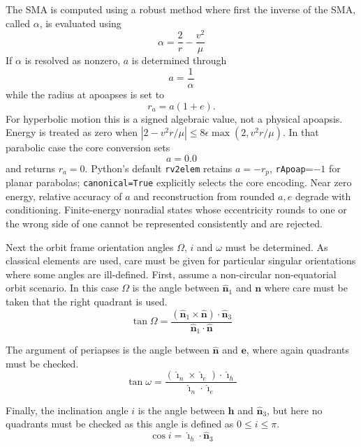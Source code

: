 The SMA is computed using a robust method where first the inverse of the SMA, called $\alpha$, is evaluated using\cite{schaub}
\begin{equation}
	\alpha = \frac{2}{r} - \frac{v^{2}}{\mu}
\end{equation}
If $\alpha$ is resolved as nonzero, $a$ is determined through
\begin{equation}
	a = \frac{1}{\alpha}
\end{equation}
while the radius at apoapses is set to
\begin{equation}
	r_{a} = a(1+e).
\end{equation}
For hyperbolic motion this is a signed algebraic value, not a physical apoapsis. Energy is treated as zero when $|2-v^2r/\mu|\leq8\epsilon\max(2,v^2r/\mu)$. In that parabolic case the core conversion sets
$$
	a = 0.0
$$
and returns $r_a=0$. Python's default {\tt rv2elem} retains $a=-r_p$, {\tt rApoap}=$-1$ for planar parabolas; {\tt canonical=True} explicitly selects the core encoding. Near zero energy, relative accuracy of $a$ and reconstruction from rounded $a,e$ degrade with conditioning. Finite-energy nonradial states whose eccentricity rounds to one or the wrong side of one cannot be represented consistently and are rejected.


Next the orbit frame orientation angles $\Omega$, $i$ and $\omega$ must be determined.  As classical elements are used, care must be given for particular singular orientations where some angles are ill-defined.  First, assume a non-circular non-equatorial orbit scenario.  In this case $\Omega$ is the angle between $\hat{\bm n}_{1}$ and $\bm n$ where care must be taken that the right quadrant is used.
\begin{equation}
	\tan \Omega = \frac{(\hat{\bm n}_{1} \times \hat{\bm n}) \cdot \hat{\bm n}_{3}}
	{\hat{\bm n}_{1} \cdot \hat{\bm n}}
\end{equation}


The argument of periapses is the angle between $\hat{\bm n}$ and $\bm e$, where again quadrants must be checked.
\begin{equation}
	\tan \omega = \frac{(\hat{\bm \imath}_{n} \times \hat{\bm \imath}_{e}) \cdot \hat{\bm \imath}_{h}}
	{\hat{\bm \imath}_{n} \cdot \hat{\bm \imath}_{e}}
\end{equation}

Finally, the inclination angle $i$ is the angle between $\bm h$ and $\hat{\bm n}_{3}$, but here no quadrants must be checked as this angle is defined as $0 \le i \le \pi$.
\begin{equation}
	\cos i = \hat{\bm \imath}_{h} \cdot \hat{\bm n}_{3}
\end{equation}

